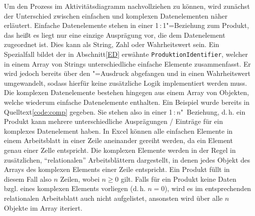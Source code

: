 Um den Prozess im Aktivitätsdiagramm nachvollziehen zu können, wird zunächst der Unterschied zwischen einfachen und komplexen Datenelementen näher erläutert. 
Einfache Datenelemente stehen in einer 1\,:\,1"=Beziehung zum Produkt, das heißt es liegt nur eine einzige Ausprägung vor, die dem Datenelement zugeordnet ist. Dies kann als String, Zahl oder Wahrheitswert sein. Ein Spezialfall bildet der in Abschnitt\nbs\ref{ED} erwähnte \texttt{ProduktionIdentifier}, welcher in einem Array von Strings unterschiedliche einfache Elemente zusammenfasst. Er wird jedoch bereits über den "=Ausdruck abgefangen und in einen Wahrheitswert umgewandelt, sodass hierfür keine zusätzliche Logik implementiert werden muss. Die komplexen Datenelemente bestehen hingegen aus einem Array von Objekten, welche wiederum einfache Datenelemente enthalten. Ein Beispiel wurde bereits in Quelltext\nbs\ref{code:comp} gegeben. Sie stehen also in einer 1\,:\,$n$"~Beziehung, d.\,h. ein Produkt kann mehrere unterschiedliche Ausprägungen / Einträge für ein komplexes Datenelement haben. In Excel können alle einfachen Elemente in einem Arbeitsblatt in einer Zeile aneinander gereiht werden, da ein Element genau einer Zelle entspricht. Die komplexen Elemente werden in der Regel in zusätzlichen, "`relationalen"' Arbeitsblättern dargestellt, in denen jedes Objekt des Arrays des komplexen Elements einer Zeile entspricht. Ein Produkt füllt in diesem Fall also $n$ Zeilen, wobei $n\geq0$ gilt. Falls für ein Produkt keine Daten bzgl. eines komplexen Elements vorliegen (d.\,h. $n=0$), wird es im entsprechenden relationalen Arbeitsblatt auch nicht aufgelistet, ansonsten wird über alle $n$\nbs Objekte im Array iteriert.


